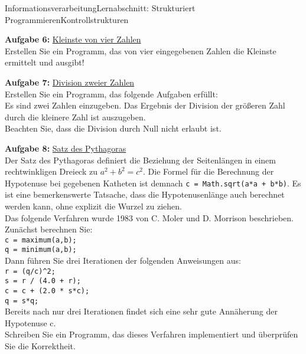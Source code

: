 \documentclass[oneside,openany,headings=optiontotoc,11pt,numbers=noenddot]{scrreprt}
\begin{document}
	\begin{worksheet}{Informationsverarbeitung}{Lernabschnitt: Strukturiert Programmieren}{Kontrollstrukturen}
		\noindent
		\sffamily
		\begin{framed}
			\noindent
			\textbf{Aufgabe 6:} \underline{Kleinste von vier Zahlen}\\
			Erstellen Sie ein Programm, das von vier eingegebenen Zahlen die Kleinste ermittelt und ausgibt!\\
			\par\noindent
			\textbf{Aufgabe 7:} \underline{Division zweier Zahlen}\\
			Erstellen Sie ein Programm, das folgende Aufgaben erfüllt:\\
			Es sind zwei Zahlen einzugeben. Das Ergebnis der Division der größeren Zahl durch die kleinere Zahl ist auszugeben.\\
			Beachten Sie, dass die Division durch Null nicht erlaubt ist.\\
			\par\noindent
			\textbf{Aufgabe 8:} \underline{Satz des Pythagoras}\\
			Der Satz des Pythagoras definiert die Beziehung der Seitenlängen in einem rechtwinkligen Dreieck zu \(a^2 + b^2 = c^2\). Die Formel für die Berechnung der Hypotenuse bei gegebenen Katheten ist demnach \lstinline[style=JavaInputStyle]|c = Math.sqrt(a*a + b*b)|. Es ist eine bemerkenswerte Tatsache, dass die Hypotenusenlänge auch berechnet werden kann, ohne explizit die Wurzel zu ziehen.\\
			Das folgende Verfahren wurde 1983 von C. Moler und D. Morrison beschrieben. Zunächst berechnen Sie:\\
			\lstinline[style=JavaInputStyle]|c = maximum(a,b);|\\
			\lstinline[style=JavaInputStyle]|q = minimum(a,b);|\\
			Dann führen Sie drei Iterationen der folgenden Anweisungen aus:\\
			\lstinline[style=JavaInputStyle]|r = (q/c)^2;|\\
			\lstinline[style=JavaInputStyle]|s = r / (4.0 + r);|\\
			\lstinline[style=JavaInputStyle]|c = c + (2.0 * s*c);|\\
			\lstinline[style=JavaInputStyle]|q = s*q;|\\
			Bereits nach nur drei Iterationen findet sich eine sehr gute Annäherung der Hypotenuse c.\\
			Schreiben Sie ein Programm, das dieses Verfahren implementiert und überprüfen Sie die Korrektheit.\\

\end{framed}
\end{worksheet}
\end{document}
